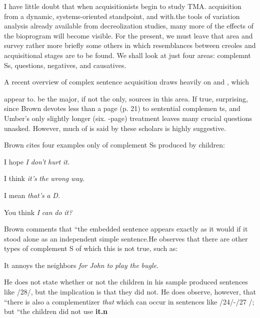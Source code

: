 I have little doubt that when acquisitionists begin to study TMA. acquisition from a dynamic, systems-oriented standpoint, and with.the tools of variation analysis already available from decreolization studies, many more of the effects of the bioprogram will become visible. For the present, we must leave that area and survey rather more briefly some others in which resemblances between creoles and acqui\-sitional stages are to be found. We shall look at just four areas: comple\-mnt Ss, questions, negatives, and causatives.

A recent overview of complex sentence acquisition \citep{Bowerman1979} draws heavily on \citet{Brown1973} and \citet{Limber1973}, which

appear to. be the major, if not the only, sources in this area. If true,
surprising, since Brown devotes less than a page (p. 21) to sen\-tential complemen ts, and Umber's only slightly longer (six. {}-page) treatment leaves many crucial questions unasked. However, much of
is said by these scholars is highly suggestive.


Brown cites four examples only of complement Ss produced by children:

\ea\label{ex:24}
 I hope \textit{I} \textit{don't} \textit{hurt} \textit{it.}
\glt
\z

\ea\label{ex:25}
 I think \textit{it's} \textit{the} \textit{wrong} \textit{way.}
\glt
\z

\ea\label{ex:26}
 I mean \textit{that's} \textit{a} \textit{D.}
\glt
\z

\ea\label{ex:27}
 You think \textit{I} \textit{can} \textit{do} \textit{it?}
\glt
\z

Brown comments that ``the embedded sentence appears exactly as it would if it stood alone as an independent simple sentence.{\textquotedbl}He observes that there are other types of complement S of which this is not true, such as:

\ea\label{ex:28}
 It annoys the neighbors \textit{for} \textit{John} \textit{to} \textit{play the} \textit{bugle.}
\glt
\z

He does not state whether or not the children in his sample produced sentences like /28/, but the implication is that they did not. He does observe, however, that ``there is also a complementizer \textit{that{\textquotedbl}} which can occur in sentences like /24/-/27 /; but ``the children did not use \textbf{it.n}

